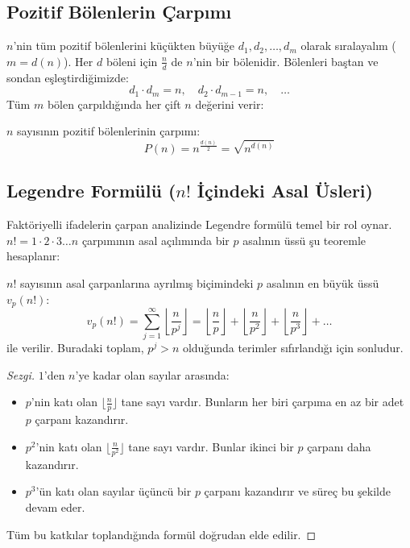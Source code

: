 \subsection{Pozitif Bölenlerin Çarpımı}

$n$'nin tüm pozitif bölenlerini küçükten büyüğe $d_1, d_2, \dots, d_m$ olarak sıralayalım ($m = d(n)$).
Her $d$ böleni için $\frac{n}{d}$ de $n$'nin bir bölenidir. Bölenleri baştan ve sondan eşleştirdiğimizde:
\[ d_1 \cdot d_m = n, \quad d_2 \cdot d_{m-1} = n, \quad \dots \]
Tüm $m$ bölen çarpıldığında her çift $n$ değerini verir:

\begin{theorem}
$n$ sayısının pozitif bölenlerinin çarpımı:
\[ P(n) = n^{\frac{d(n)}{2}} = \sqrt{n^{d(n)}} \]
\end{theorem}

\subsection{Legendre Formülü ($n!$ İçindeki Asal Üsleri)}

Faktöriyelli ifadelerin çarpan analizinde Legendre formülü temel bir rol oynar. $n! = 1 \cdot 2 \cdot 3 \dots n$ çarpımının asal açılımında bir $p$ asalının üssü şu teoremle hesaplanır:

\begin{theorem}
$n!$ sayısının asal çarpanlarına ayrılmış biçimindeki $p$ asalının en büyük üssü $v_p(n!)$:
\[ v_p(n!) = \sum_{j=1}^{\infty} \left\lfloor \frac{n}{p^j} \right\rfloor = \left\lfloor \frac{n}{p} \right\rfloor + \left\lfloor \frac{n}{p^2} \right\rfloor + \left\lfloor \frac{n}{p^3} \right\rfloor + \dots \]
ile verilir. Buradaki toplam, $p^j > n$ olduğunda terimler sıfırlandığı için sonludur.
\end{theorem}

\begin{proof}[Sezgi]
$1$'den $n$'ye kadar olan sayılar arasında:
\begin{itemize}
    \item $p$'nin katı olan $\lfloor \frac{n}{p} \rfloor$ tane sayı vardır. Bunların her biri çarpıma en az bir adet $p$ çarpanı kazandırır.
    \item $p^2$'nin katı olan $\lfloor \frac{n}{p^2} \rfloor$ tane sayı vardır. Bunlar ikinci bir $p$ çarpanı daha kazandırır.
    \item $p^3$'ün katı olan sayılar üçüncü bir $p$ çarpanı kazandırır ve süreç bu şekilde devam eder.
\end{itemize}
Tüm bu katkılar toplandığında formül doğrudan elde edilir.
\end{proof}

